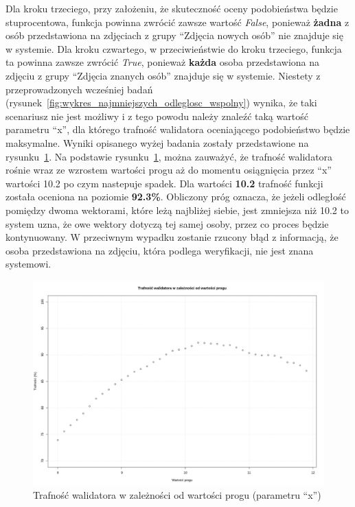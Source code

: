 Dla kroku trzeciego, przy założeniu, że skuteczność oceny podobieństwa będzie stuprocentowa, funkcja
powinna zwrócić zawsze wartość \textit{False}, ponieważ \textbf{żadna} z osób przedstawiona
na zdjęciach z grupy ``Zdjęcia nowych osób'' nie znajduje się w systemie.
Dla kroku czwartego, w przeciwieństwie do kroku trzeciego, funkcja ta powinna
zawsze zwrócić \textit{True}, ponieważ \textbf{każda}
osoba przedstawiona na zdjęciu z grupy ``Zdjęcia znanych osób'' znajduje się w systemie.
Niestety z przeprowadzonych wcześniej badań (rysunek~\ref{fig:wykres_najmniejszych_odleglosc_wspolny}) wynika,
że taki scenariusz nie jest możliwy i z tego powodu należy znaleźć taką wartość parametru ``x'',
dla którego trafność walidatora oceniającego podobieństwo będzie maksymalne.
Wyniki opisanego wyżej badania zostały przedstawione na rysunku~\ref{fig:tranosc_walidatora_per_prog}.
Na podstawie rysunku~\ref{fig:tranosc_walidatora_per_prog}, można zauważyć, że trafność walidatora
rośnie wraz ze wzrostem wartości progu aż do momentu osiągnięcia
przez ``x'' wartości \num{10.2} po czym nastepuje spadek.
Dla wartości \textbf{10.2} trafność funkcji została oceniona na poziomie \textbf{92.3\%}.
Obliczony próg oznacza, że jeżeli odległość pomiędzy dwoma wektorami, które leżą najbliżej siebie,
jest zmniejsza niż \num{10.2} to system uzna, że owe wektory dotyczą tej samej osoby,
przez co proces będzie kontynuowany.
W przeciwnym wypadku zostanie rzucony błąd z informacją, że osoba przedstawiona na zdjęciu,
która podlega weryfikacji, nie jest znana systemowi.

\begin{figure}[]
    \centering
    \includegraphics[width=1\textwidth]{images/trafnosc_walidator_a_prog}
    \caption{ Trafność walidatora w zależności od wartości progu (parametru ``x'') }
    \customsource
    \label{fig:tranosc_walidatora_per_prog}
\end{figure}


